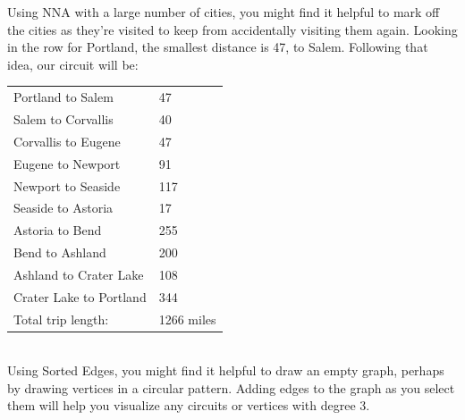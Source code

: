 \begin{example}{}
\noindent Using NNA with a large number of cities, you might find it helpful to mark off the cities as they're visited to keep from accidentally visiting them again.  Looking in the row for Portland, the smallest distance is 47, to Salem.  Following that idea, our circuit will be:\\
\begin{minipage}{0.5\textwidth}
\begin{tabular}{ll}
Portland to Salem&		47\\
Salem to Corvallis&		40\\
Corvallis to Eugene&		47\\
Eugene to Newport	&	91\\
Newport to Seaside	&	117\\
Seaside to Astoria	&	17\\
Astoria to Bend		&255\\
Bend to Ashland	&	200\\
Ashland to Crater Lake&	108\\
Crater Lake to Portland&	344\\
Total trip length:		&1266 miles\\
\end{tabular}\\

Using Sorted Edges, you might find it helpful to draw an empty graph, perhaps by drawing vertices in a circular pattern.  Adding edges to the graph as you select them will help you visualize any circuits or vertices with degree 3.\\
\end{minipage}
%
\begin{minipage}{0.5\textwidth}
\vspace{0.5in}
\end{minipage}


\end{example}

